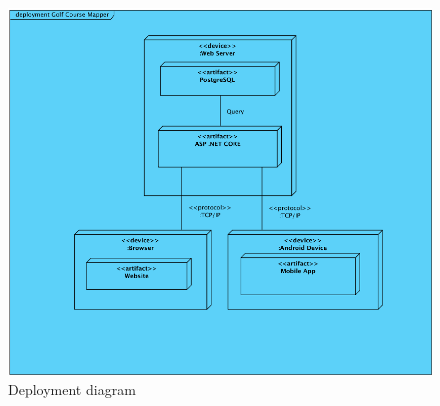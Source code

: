 \documentclass{article}
\begin{document}
    \paragraph{}

    \begin{center}
        \begin{figure}[h]
            \centering
            \includegraphics[scale=0.9]{DeploymentDiagram}
            \caption{Deployment diagram}
            \label{deploymentdiagram}
        \end{figure}
    \end{center}
\end{document}

